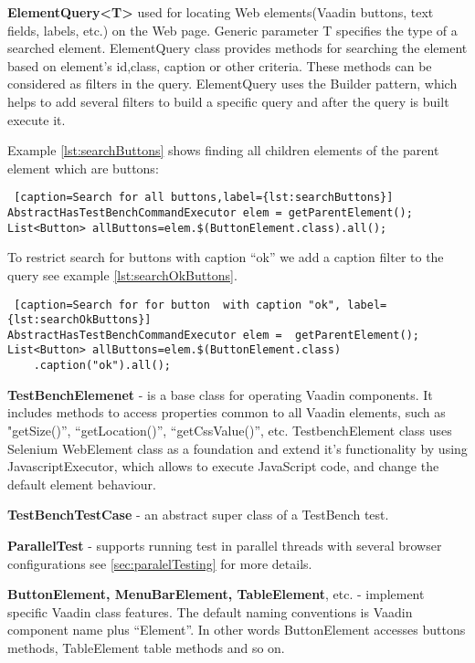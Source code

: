   
\textbf{ElementQuery<T>} used for locating Web elements(Vaadin buttons, text
fields, labels, etc.) on the Web page. Generic parameter T specifies the type of a searched element. 
 ElementQuery class provides methods for searching the element based on
 element's id,class, caption or other criteria. These methods can be considered
 as filters in the query. ElementQuery uses the Builder pattern, 
 which helps to add several filters to build a specific query and after
 the query is built execute it.

Example \ref{lst:searchButtons} shows finding all children elements of the
parent element  which are buttons:
  \lstset{style=a1listing}
\begin{lstlisting} [caption=Search for all buttons,label={lst:searchButtons}]
AbstractHasTestBenchCommandExecutor elem = getParentElement();
List<Button> allButtons=elem.$(ButtonElement.class).all();
\end{lstlisting}
  
To restrict search for buttons with caption ``ok'' we add a caption filter to
the query see example \ref{lst:searchOkButtons}.
  \lstset{style=a1listing}
  \begin{lstlisting} [caption=Search for for button  with caption "ok", label={lst:searchOkButtons}]
AbstractHasTestBenchCommandExecutor elem =  getParentElement();
List<Button> allButtons=elem.$(ButtonElement.class)
	.caption("ok").all();
  \end{lstlisting}
  
\textbf{TestBenchElemenet} - is a base class for operating Vaadin components. It
includes methods to access properties common to all Vaadin elements,
such as "getSize()'', ``getLocation()'', ``getCssValue()'', etc.
TestbenchElement class uses Selenium WebElement class as a foundation and extend
it's functionality by using JavascriptExecutor,
which allows to execute JavaScript code, and change the default element behaviour.

\textbf{TestBenchTestCase} - an abstract super class of a TestBench test.

\textbf{ParallelTest} - supports running test in parallel threads with several
browser configurations see \ref{sec:paralelTesting} for more details.

\textbf{ButtonElement, MenuBarElement, TableElement}, etc. - implement specific
Vaadin class features. The default naming conventions is Vaadin component name
plus ``Element''. In other words ButtonElement accesses buttons methods,
TableElement table methods and so on.

